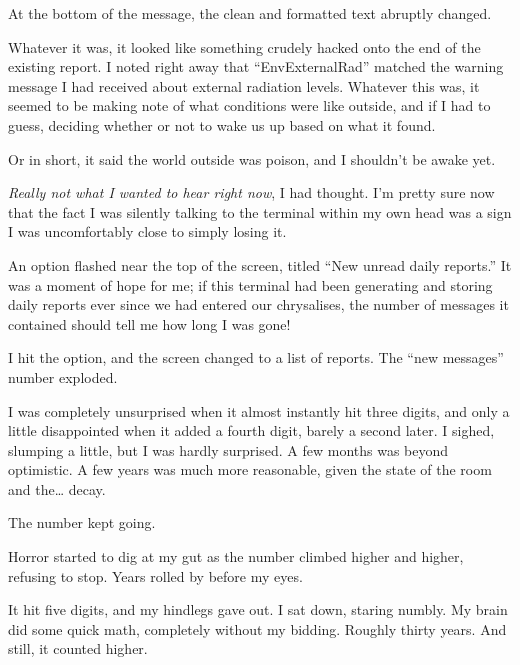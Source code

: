 At the bottom of the message, the clean and formatted text abruptly changed.


Whatever it was, it looked like something crudely hacked onto the end of the existing report. I noted right away that “EnvExternalRad” matched the warning message I had received about external radiation levels. Whatever this was, it seemed to be making note of what conditions were like outside, and if I had to guess, deciding whether or not to wake us up based on what it found.

Or in short, it said the world outside was poison, and I shouldn’t be awake yet.

\textit{Really not what I wanted to hear right now}, I had thought. I’m pretty sure now that the fact I was silently talking to the terminal within my own head was a sign I was uncomfortably close to simply losing it.

An option flashed near the top of the screen, titled “New unread daily reports.” It was a moment of hope for me; if this terminal had been generating and storing daily reports ever since we had entered our chrysalises, the number of messages it contained should tell me how long I was gone!

I hit the option, and the screen changed to a list of reports. The “new messages” number exploded.

I was completely unsurprised when it almost instantly hit three digits, and only a little disappointed when it added a fourth digit, barely a second later. I sighed, slumping a little, but I was hardly surprised. A few months was beyond optimistic. A few years was much more reasonable, given the state of the room and the… decay.

The number kept going.

Horror started to dig at my gut as the number climbed higher and higher, refusing to stop. Years rolled by before my eyes.

It hit five digits, and my hindlegs gave out. I sat down, staring numbly. My brain did some quick math, completely without my bidding. Roughly thirty years. And still, it counted higher.

